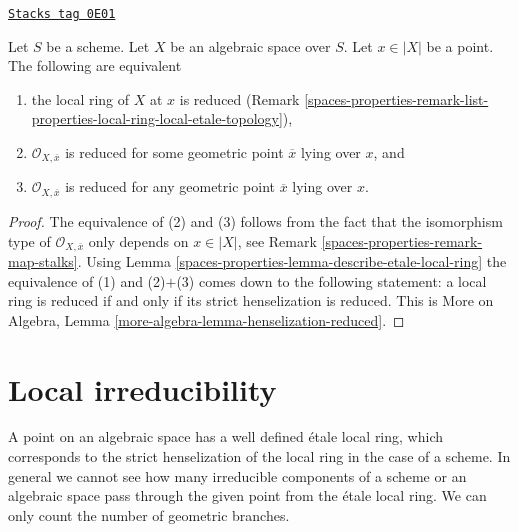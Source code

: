 \begin{lemma}
\label{spaces-properties-lemma-reduced-local-ring}
\href{https://stacks.math.columbia.edu/tag/0E01}{\texttt{Stacks tag 0E01}}

Let $S$ be a scheme. Let $X$ be an algebraic space over $S$.
Let $x \in |X|$ be a point. The following are equivalent
\begin{enumerate}
\item the local ring of $X$ at $x$ is reduced
(Remark \ref{spaces-properties-remark-list-properties-local-ring-local-etale-topology}),
\item $\mathcal{O}_{X, \overline{x}}$ is reduced for some geometric
point $\overline{x}$ lying over $x$, and
\item $\mathcal{O}_{X, \overline{x}}$ is reduced for any geometric
point $\overline{x}$ lying over $x$.
\end{enumerate}
\end{lemma}

\begin{proof}
The equivalence of (2) and (3) follows from the fact that the
isomorphism type of $\mathcal{O}_{X, \overline{x}}$ only depends
on $x \in |X|$, see Remark \ref{spaces-properties-remark-map-stalks}.
Using Lemma \ref{spaces-properties-lemma-describe-etale-local-ring}
the equivalence of (1) and (2)$+$(3) comes down to the
following statement: a local ring is reduced if and only if
its strict henselization is reduced. This is
More on Algebra, Lemma \ref{more-algebra-lemma-henselization-reduced}.
\end{proof}

\section{Local irreducibility}
\label{spaces-properties-section-irreducible-local-ring}
A point on an algebraic space has a well defined \'etale local ring, which
corresponds to the strict henselization of the local ring in the case of a
scheme. In general we cannot see how many irreducible components of a
scheme or an algebraic space pass through the given point from the
\'etale local ring. We can only count the number of geometric branches.

